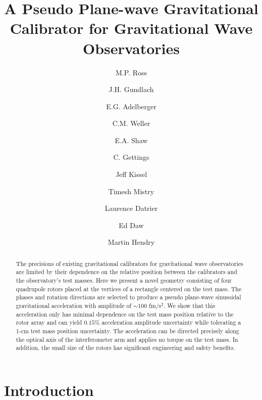 \documentclass[superscriptaddress, twocolumn, prd]{revtex4-1}
\begin{document}
\title{A Pseudo Plane-wave Gravitational Calibrator for Gravitational Wave Observatories}

\author{M.P. Ross}
\author{J.H. Gundlach}
\author{E.G. Adelberger}
\author{C.M. Weller}
\author{E.A. Shaw}
\author{C. Gettings}
\author{Jeff Kissel}
\author{Timesh Mistry}
\author{Laurence Datrier}
\author{Ed Daw}
\author{Martin Hendry}



\begin{abstract}

 The precisions of existing gravitational calibrators for gravitational wave observatories are limited by their dependence on the relative position between the calibrators and the observatory's test masses. Here we present a novel geometry consisting of four quadrupole rotors placed at the vertices of a rectangle centered on the test mass. The phases and rotation directions are selected to produce a pseudo plane-wave  sinusoidal gravitational acceleration with amplitude of $\sim100$ fm/s$^2$. We show that this acceleration only has minimal dependence on the test mass position relative to the rotor array and can yield $0.15 \%$ acceleration amplitude uncertainty while tolerating a 1-cm test mass position uncertainty. The acceleration can be directed precisely along the optical axis of the interferometer arm and applies no torque on the test mass. In addition, the small size of the rotors has significant engineering and safety benefits.

\end{abstract}

\maketitle

\section{Introduction}
\end{document}
